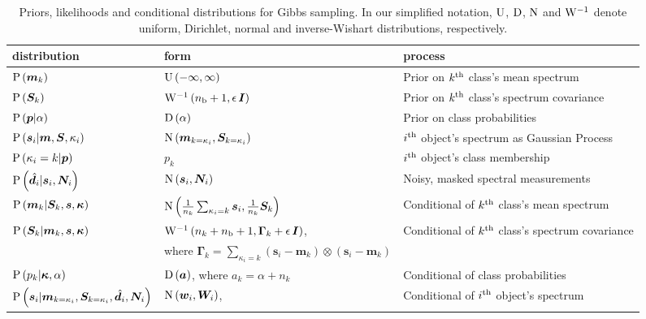 \documentclass[a4paper,fleqn,usenatbib]{mnras}
\newcommand{\nb}{n_{\rm b}}
\newcommand{\prob}{{\rm P}}
\newcommand{\normal}{{\rm{N}}}
\newcommand{\uniform}{{\rm U}}
\newcommand{\dirichlet}{{\rm D}}
\newcommand{\invwish}{{\rm W}^{-1}}
\newcommand{\alphas}{{\bm a}}
\newcommand{\specmean}{{\bm m}}
\newcommand{\speccov}{{\bm S}}
\newcommand{\classprob}{{p}}
\newcommand{\classprobs}{{\bm p}}
\newcommand{\objspec}{{\bm s}}
\newcommand{\objclass}{{\kappa}}
\newcommand{\objclasses}{{\bm \kappa}}
\newcommand{\objdata}{\hat{\bm d}}
\newcommand{\objnoise}{{\bm N}}
\newcommand{\identity}{{\bm I}}
\newcommand{\scalemat}{{\bm \Gamma}}
\newcommand{\wfmean}{{\bm w}}
\newcommand{\wfcov}{{\bm W}}
\begin{document}
\begin{table}
    \centering
    \caption{Priors, likelihoods and conditional distributions for Gibbs sampling. In our simplified notation, $\uniform$, $\dirichlet$, $\normal$ and $\invwish$ denote uniform, Dirichlet, normal and inverse-Wishart distributions, respectively.}
    \label{tab:prob_dists}
    \begin{tabular}{lll}
        \hline
        distribution & form & process \\
        \hline
        $\prob\left(\specmean_k\right)$ & $\uniform\left(-\infty,\infty\right)$ & Prior on $k^{\rm th}$ class's mean spectrum \\
        $\prob\left(\speccov_k\right)$ & $\invwish \left(\nb+1, \epsilon\,\identity \right)$ & Prior on $k^{\rm th}$ class's spectrum covariance \\
        $\prob\left(\classprobs|\alpha\right)$ & $\dirichlet\left(\alpha\right)$ & Prior on class probabilities \\
        $\prob\left(\objspec_i|\specmean,\speccov,\objclass_i\right)$ & $\normal\left(\specmean_{k=\objclass_i},\speccov_{k=\objclass_i}\right)$ & $i^{\rm th}$ object's spectrum as Gaussian Process \\
        $\prob\left(\objclass_i = k|\classprobs\right)$ & $\classprob_k$ & $i^{\rm th}$ object's class membership \\
        $\prob\left(\objdata_i|\objspec_i,\objnoise_i\right)$ & $\normal\left(\objspec_i,\objnoise_i\right)$ & Noisy, masked spectral measurements \\
        \hline
        $\prob\left(\specmean_k | \speccov_k, \objspec, \objclasses \right)$ & $\normal \left( \frac{1}{n_k} \sum_{\objclass_i = k} \objspec_i, \frac{1}{n_k} \speccov_k \right)$ & Conditional of $k^{\rm th}$ class's mean spectrum \\
        $\prob\left(\speccov_k | \specmean_k, \objspec, \objclasses \right)$ & $\invwish \left(n_k + \nb + 1, \scalemat_k + \epsilon \, \identity \right)$, & Conditional of $k^{\rm th}$ class's spectrum covariance \\
         & where  $\scalemat_k = \sum_{\objclass_i = k} \left( \objspec_i - \specmean_k \right) \otimes \left( \objspec_i - \specmean_k \right)$ & \\
        $\prob\left(\classprob_k | \objclasses, \alpha\right)$ & $\dirichlet\left(\alphas\right)$, where $a_k = \alpha + n_k$ & Conditional of class probabilities \\
        $\prob \left( \objspec_i | \specmean_{k=\objclass_i}, \speccov_{k=\objclass_i}, \objdata_i, \objnoise_i \right)$ & $\normal \left( \wfmean_i, \wfcov_i \right)$, & Conditional of $i^{\rm th}$ object's spectrum \\

\end{tabular}
\end{table}
\end{document}
